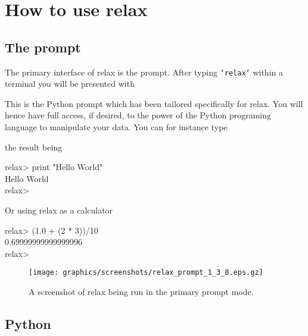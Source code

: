 
\section{How to use relax}



\subsection{The prompt}

The primary interface of relax is the prompt.  After typing \texttt{`relax'} within a terminal you will be presented with


This is the Python prompt which has been tailored specifically for relax.  You will hence have full access, if desired, to the power of the Python programing language to manipulate your data.  You can for instance type


the result being

\begin{exampleenv}
relax> print "Hello World" \\
Hello World \\
relax>
\end{exampleenv}

Or using relax as a calculator

\begin{exampleenv}
relax> (1.0 + (2 * 3))/10 \\
0.69999999999999996 \\
relax>
\end{exampleenv}

\begin{figure}
\centerline{\texttt{[image: graphics/screenshots/relax\_prompt\_1\_3\_8.eps.gz]}}
\caption[Prompt screenshot]{A screenshot of relax being run in the primary prompt mode.}\label{fig: relax prompt}
\end{figure}




\subsection{Python}


